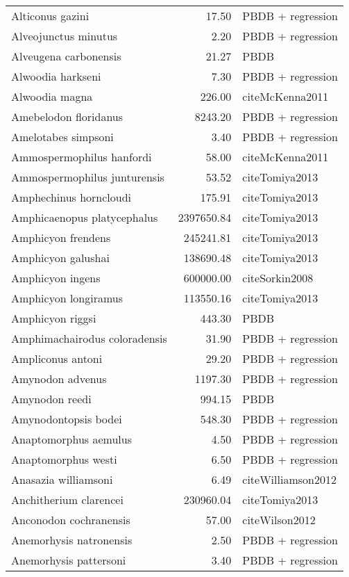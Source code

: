 \begin{table}[ht]
\begin{tabular}{lrl}
  Alticonus gazini & 17.50 & PBDB + regression \\ 
  Alveojunctus minutus & 2.20 & PBDB + regression \\ 
  Alveugena carbonensis & 21.27 & PBDB \\ 
  Alwoodia harkseni & 7.30 & PBDB + regression \\ 
  Alwoodia magna & 226.00 & cite{McKenna2011} \\ 
  Amebelodon floridanus & 8243.20 & PBDB + regression \\ 
  Amelotabes simpsoni & 3.40 & PBDB + regression \\ 
  Ammospermophilus hanfordi & 58.00 & cite{McKenna2011} \\ 
  Ammospermophilus junturensis & 53.52 & cite{Tomiya2013} \\ 
  Amphechinus horncloudi & 175.91 & cite{Tomiya2013} \\ 
  Amphicaenopus platycephalus & 2397650.84 & cite{Tomiya2013} \\ 
  Amphicyon frendens & 245241.81 & cite{Tomiya2013} \\ 
  Amphicyon galushai & 138690.48 & cite{Tomiya2013} \\ 
  Amphicyon ingens & 600000.00 & cite{Sorkin2008} \\ 
  Amphicyon longiramus & 113550.16 & cite{Tomiya2013} \\ 
  Amphicyon riggsi & 443.30 & PBDB \\ 
  Amphimachairodus coloradensis & 31.90 & PBDB + regression \\ 
  Ampliconus antoni & 29.20 & PBDB + regression \\ 
  Amynodon advenus & 1197.30 & PBDB + regression \\ 
  Amynodon reedi & 994.15 & PBDB \\ 
  Amynodontopsis bodei & 548.30 & PBDB + regression \\ 
  Anaptomorphus aemulus & 4.50 & PBDB + regression \\ 
  Anaptomorphus westi & 6.50 & PBDB + regression \\ 
  Anasazia williamsoni & 6.49 & cite{Williamson2012} \\ 
  Anchitherium clarencei & 230960.04 & cite{Tomiya2013} \\ 
  Anconodon cochranensis & 57.00 & cite{Wilson2012} \\ 
  Anemorhysis natronensis & 2.50 & PBDB + regression \\ 
  Anemorhysis pattersoni & 3.40 & PBDB + regression \\ 

\end{tabular}
\end{table}
